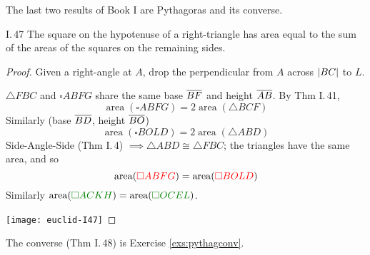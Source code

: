 The last two results of Book I are Pythagoras and its converse.

\begin{thm*}{I.\,47}{}
	The square on the hypotenuse of a right-triangle has area equal to the sum of the areas of the squares on the remaining sides.
\end{thm*}

\begin{proof}
	Given a right-angle at $A$, drop the perpendicular from $A$ across $\left| BC\right|$ to $L$.\par
	\begin{minipage}[t]{0.6\linewidth}\vspace{-5pt}
		$\triangle FBC$ and $\square ABFG$ share the same base $\overline{BF}$ and height $\overline{AB}$. By Thm I.\,41,
		\[
			\operatorname{area}(\square ABFG)=2\operatorname{area}(\triangle BCF)
		\]
		Similarly (base $\overline{BD}$, height $\overline{BO}$)
		\[
			\operatorname{area}(\square BOLD)=2\operatorname{area}(\triangle ABD)
		\]
		Side-Angle-Side (Thm I.\,4) $\implies\triangle ABD\cong\triangle FBC$; the triangles have the same area, and so
		\[
			\operatorname{area}(\textcolor{red}{\square ABFG})=\operatorname{area}(\textcolor{red}{\square BOLD})
		\]
		Similarly $\operatorname{area}(\textcolor{Green}{\square ACKH})=\operatorname{area}(\textcolor{Green}{\square OCEL})$.
	\end{minipage}
	\hfill
	\begin{minipage}[t]{0.39\linewidth}\vspace{-12pt}
		\texttt{[image: euclid-I47]}
	\end{minipage}
\end{proof}

The converse (Thm I.\,48) is Exercise \ref{exs:pythagconv}.


\goodbreak%


